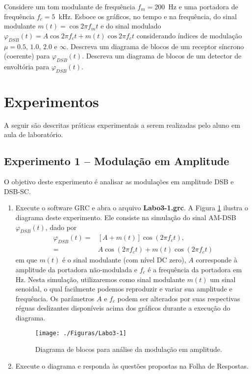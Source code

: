 \documentclass[12pt,addpoints]{exam}
\newcommand{\myscale}{0.4}
\begin{document}
\begin{questions}
  \question Considere um tom modulante de frequência $f_{m} = 200$~Hz e uma portadora de frequência $f_{c} = 5$~kHz. Esboce os gráficos, no tempo e na frequência, do sinal modulante $m(t) = \cos{2\pi f_{m}t}$ e do sinal modulado $\varphi_{DSB}(t) = A\cos{2\pi f_{c}t} + m(t)\cos{2\pi f_{c}t}$ considerando índices de modulação $\mu = 0.5$, $1.0$, $2.0$ e $\infty$. %
  \question Descreva um diagrama de blocos de um receptor síncrono (coerente) para $\varphi_{DSB}(t)$.
  \question Descreva um diagrama de blocos de um detector de envoltória para $\varphi_{DSB}(t)$.
\end{questions}

\section{Experimentos}

A seguir são descritas práticas experimentais a serem realizadas pelo aluno em aula de laboratório. 

\subsection{Experimento 1 -- Modulação em Amplitude}

O objetivo deste experimento é analisar as modulações em amplitude DSB e DSB-SC.

\begin{enumerate}   
    \item Execute o software GRC e abra o arquivo \textbf{Labo3-1.grc}. A Figura \ref{fig:GRC_3-1} ilustra o diagrama deste experimento. Ele consiste na simulação do sinal AM-DSB $\varphi_{DSB}(t)$, dado por 
\begin{align} \label{eq:am}
    \varphi_{DSB}(t) =& [A + m(t)]\cos(2\pi f_{c}t),\\
        		    =& A\cos(2\pi f_{c}t) + m(t)\cos(2\pi f_{c}t)    
\end{align}
em que $m(t)$ é o sinal modulante (com nível DC zero), $A$ corresponde à amplitude da portadora não-modulada e $f_c$ é a frequência da portadora em Hz. Nesta simulação, utilizaremos como sinal modulante $m(t)$ um sinal senoidal, o qual facilmente podemos reproduzir e variar sua amplitude e frequência. Os parâmetros $A$ e $f_c$ podem ser alterados por suas respectivas réguas deslizantes disponíveis acima dos gráficos durante a execução do diagrama.
    \begin{figure}[htb]
        \centering
        \texttt{[image: ./Figuras/Labo3-1]}
        \caption{Diagrama de blocos para análise da modulação em amplitude.} 
        \label{fig:GRC_3-1}
    \end{figure}
  \item Execute o diagrama e responda às questões propostas na Folha de Respostas.
\end{enumerate}
\end{document}
